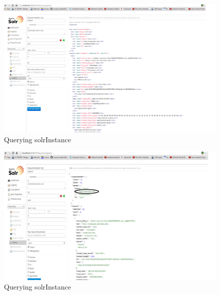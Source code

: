 \documentclass[12pt]{Report}
\begin{document}
\newpage
\begin{figure}[ht]    
    \begin{center}
        \includegraphics[scale=0.60]{hostname-xmlsearch.png}
        \caption{Querying solrInstance }
        \label{Querying SOLR}
    \end{center}
\end{figure}
\newpage




  \newpage
\begin{figure}[ht]    
    \begin{center}
        \includegraphics[scale=0.60]{changeinhostname.png}
        \caption{Querying solrInstance }
        \label{Querying SOLR}
    \end{center}
\end{figure}
\newpage
\end{document}
